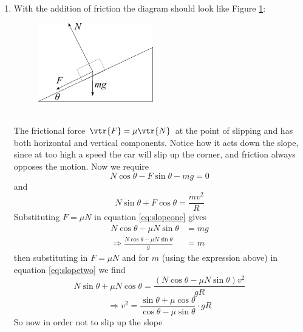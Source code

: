 \begin{problem}
{\begin{enumerate}
\begin{enumerate}
\begin{equation*} \Rightarrow v^2=gR\tan\theta \end{equation*}
So the requirement for the car to successfully go around the corner without slipping is 
\begin{equation*}
v=\sqrt{gR\tan\theta}
\end{equation*}
\\
\item With the addition of friction the diagram should look like Figure \ref{fig:CircularMotion_e}:
\begin{figure}[h]
\centering
\includegraphics[width=5cm]{CircularMotion_e}
\caption{}
\label{fig:CircularMotion_e}
\end{figure}
\\
The frictional force $\vtr{F}=\mu \vtr{N}$ at the point of slipping and has both horizontal and vertical components. Notice how it acts down the slope, since at too high a speed the car will slip up the corner, and friction always opposes the motion. Now we require
\begin{equation} \label{eq:slopeone} N\cos\theta-F\sin\theta-mg=0 \end{equation}
and
\begin{equation} \label{eq:slopetwo} N\sin\theta+F\cos\theta=\frac{mv^2}{R} \end{equation}
Substituting $F=\mu N$ in equation \eqref{eq:slopeone} gives
\begin{align*}
N\cos\theta-\mu N\sin\theta&=mg \\
\Rightarrow \frac{N\cos\theta-\mu N\sin\theta}{g}&=m
\end{align*}
then substituting in $F=\mu N$ and for $m$ (using the expression above) in equation \eqref{eq:slopetwo} we find
\begin{equation*} N\sin\theta+\mu N\cos\theta=\frac{\left(N\cos\theta-\mu N\sin\theta\right)v^2}{gR} \end{equation*} 
\begin{equation*} \Rightarrow v^2=\frac{\sin\theta+\mu \cos\theta}{\cos\theta-\mu \sin\theta}\cdot gR \end{equation*}
So now in order not to slip up the slope

\end{enumerate}
\end{enumerate}}
\end{problem}
